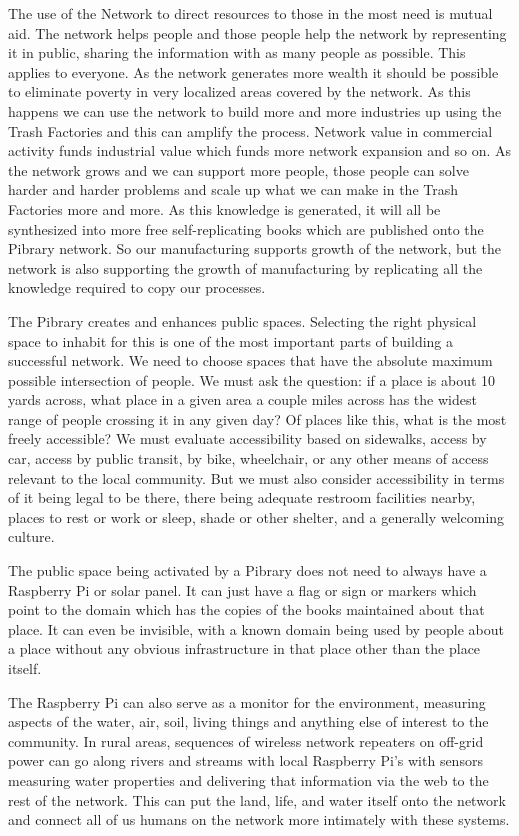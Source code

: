 The use of the Network to direct resources to those in the most need is
mutual aid. The network helps people and those people help the network
by representing it in public, sharing the information with as many
people as possible. This applies to everyone. As the network generates
more wealth it should be possible to eliminate poverty in very localized
areas covered by the network. As this happens we can use the network to
build more and more industries up using the Trash Factories and this can
amplify the process. Network value in commercial activity funds
industrial value which funds more network expansion and so on. As the
network grows and we can support more people, those people can solve
harder and harder problems and scale up what we can make in the Trash
Factories more and more. As this knowledge is generated, it will all be
synthesized into more free self-replicating books which are published
onto the Pibrary network. So our manufacturing supports growth of the
network, but the network is also supporting the growth of manufacturing
by replicating all the knowledge required to copy our processes.

The Pibrary creates and enhances public spaces. Selecting the right
physical space to inhabit for this is one of the most important parts of
building a successful network. We need to choose spaces that have the
absolute maximum possible intersection of people. We must ask the
question: if a place is about 10 yards across, what place in a given
area a couple miles across has the widest range of people crossing it in
any given day? Of places like this, what is the most freely accessible?
We must evaluate accessibility based on sidewalks, access by car, access
by public transit, by bike, wheelchair, or any other means of access
relevant to the local community. But we must also consider accessibility
in terms of it being legal to be there, there being adequate restroom
facilities nearby, places to rest or work or sleep, shade or other
shelter, and a generally welcoming culture.

The public space being activated by a Pibrary does not need to always
have a Raspberry Pi or solar panel. It can just have a flag or sign or
markers which point to the domain which has the copies of the books
maintained about that place. It can even be invisible, with a known
domain being used by people about a place without any obvious
infrastructure in that place other than the place itself.

The Raspberry Pi can also serve as a monitor for the environment,
measuring aspects of the water, air, soil, living things and anything
else of interest to the community. In rural areas, sequences of wireless
network repeaters on off-grid power can go along rivers and streams with
local Raspberry Pi's with sensors measuring water properties and
delivering that information via the web to the rest of the network. This
can put the land, life, and water itself onto the network and connect
all of us humans on the network more intimately with these systems.
